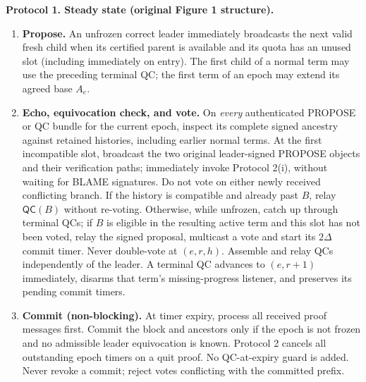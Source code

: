 \documentclass[10pt,a4paper]{article}
\newcommand{\QC}{\mathsf{QC}}
\newcommand{\chg}[1]{\textcolor{red!70!black}{#1}}
\begin{document}
\begin{mdframed}[linewidth=.6pt,innertopmargin=5pt,innerbottommargin=5pt]
\textbf{Protocol 1. Steady state (original Figure 1 structure).}
\begin{enumerate}[label=\textbf{\arabic*.},itemsep=3pt]
\item \textbf{Propose.} An unfrozen correct leader immediately broadcasts the next
valid fresh child when its certified parent is available and its quota
has an unused slot (including immediately on entry). \chg{The first child of a normal term may use the preceding
terminal QC; the first term of an epoch may extend its agreed base $A_e$.}
\item \textbf{Echo, equivocation check, and vote.} On \emph{every}
authenticated PROPOSE or QC bundle for the current epoch, inspect its
complete signed ancestry against retained histories, including earlier
normal terms. \chg{At the first incompatible slot, broadcast the two
original leader-signed PROPOSE objects and their verification paths;
immediately invoke Protocol 2(i), without waiting for BLAME signatures.
Do not vote on either newly received conflicting branch.}
If the history is compatible and already past $B$, relay $\QC(B)$ without
re-voting. Otherwise, while unfrozen, catch up through terminal QCs;
if $B$ is eligible in the resulting active term and this slot has not
been voted, relay the signed proposal, multicast a vote and start its
$2\Delta$ commit timer. Never double-vote at $(e,r,h)$. Assemble and relay
QCs independently of the leader. \chg{A terminal QC advances to $(e,r+1)$
immediately, disarms that term's missing-progress listener, and preserves
its pending commit timers.}
\item \textbf{Commit (non-blocking).} At timer expiry, process all
received proof messages first. Commit the block and ancestors only if the
epoch is not frozen and no admissible leader equivocation is known.
\chg{Protocol 2 cancels all outstanding epoch timers on a quit proof.}
No QC-at-expiry guard is added. Never revoke a commit; reject votes
conflicting with the committed prefix.
\end{enumerate}
\end{mdframed}
\end{document}
